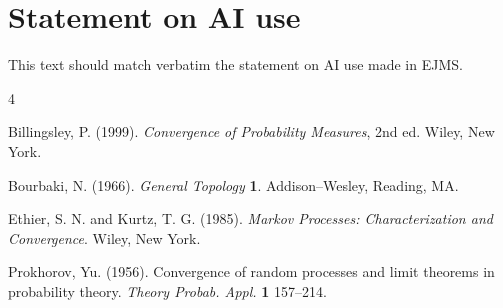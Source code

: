 \documentclass[aihp]{imsart}
\theoremstyle{plain}
\theoremstyle{definition}
\begin{document}
\section*{Statement on AI use}
This text should match verbatim the statement on AI use made in EJMS.


\begin{thebibliography}{4}

Billingsley, P. (1999). \textit{Convergence of
Probability Measures}, 2nd ed.
Wiley, New York.

Bourbaki, N.  (1966). \textit{General Topology}  \textbf{1}.
Addison--Wesley, Reading, MA.

Ethier, S. N. and Kurtz, T. G. (1985).
\textit{Markov Processes: Characterization and Convergence}.
Wiley, New York.

Prokhorov, Yu. (1956).
Convergence of random processes and limit theorems in probability
theory. \textit{Theory  Probab.  Appl.}
\textbf{1} 157--214.

\end{thebibliography}
\end{document}
